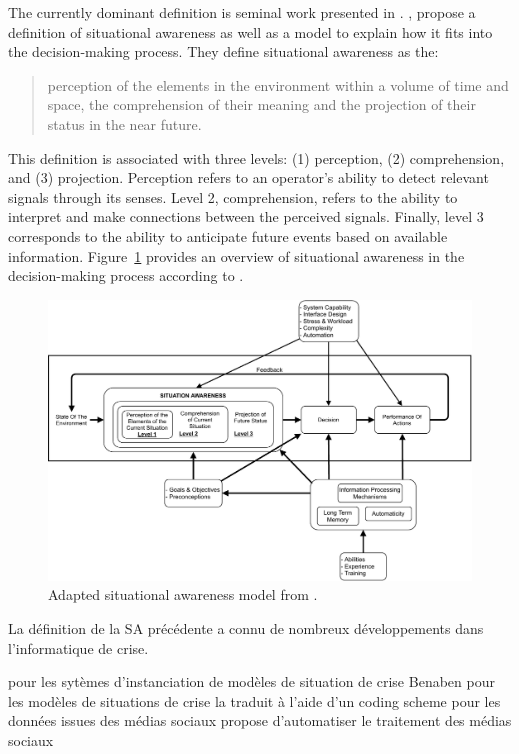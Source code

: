 The currently dominant definition is seminal work presented in \parencite{endsleyTheorySituationAwareness1995}.
\citeauthor{endsleyTheorySituationAwareness1995}, propose a definition of situational awareness as well as a model to explain how it fits into the decision-making process.
They define situational awareness as the:
\blockquote{perception of the elements in the environment within a volume of time and space, the comprehension of their meaning and the projection of their status in the near future.}
This definition is associated with three levels: (1) perception, (2) comprehension, and (3) projection.
Perception refers to an operator's ability to detect relevant signals through its senses.
Level 2, comprehension, refers to the ability to interpret and make connections between the perceived signals.
Finally, level 3 corresponds to the ability to anticipate future events based on available information.
Figure~\ref{information:SA} provides an overview of situational awareness in the decision-making process according to \parencite{endsleyTheorySituationAwareness1995}.

\begin{figure}[htb]
    \centering
    \includegraphics[width=\textwidth]{figures/chap-3/Endsley-1995.pdf}
    \caption{Adapted situational awareness model from \textcite{endsleyTheorySituationAwareness1995}.}
    \label{information:SA}
\end{figure}

La définition de la SA précédente a connu de nombreux développements dans l'informatique de crise.

\textcite{fertierRealtimeDataExploitation2020} pour les sytèmes d'instanciation de modèles de situation de crise
Benaben pour les modèles de situations de crise
\textcite{viewegSituationalAwarenessMass2012} la traduit à l'aide d'un coding scheme pour les données issues des médias sociaux
\textcite{vermaNaturalLanguageProcessing2011} propose d'automatiser le traitement des médias sociaux

